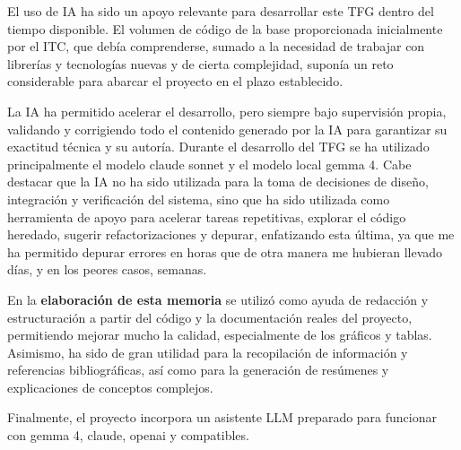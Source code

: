 El uso de IA ha sido un apoyo relevante para desarrollar este TFG dentro del tiempo disponible.
El volumen de código de la base proporcionada inicialmente por el ITC, que debía comprenderse,
sumado a la necesidad de trabajar con librerías y tecnologías nuevas y de cierta complejidad,
suponía un reto considerable para abarcar el proyecto en el plazo establecido.

La IA ha permitido acelerar el desarrollo, pero siempre bajo supervisión propia, validando y 
corrigiendo todo el contenido generado por la IA para garantizar su exactitud técnica y su autoría.
Durante el desarrollo del TFG se ha utilizado principalmente el modelo claude sonnet y el modelo local
gemma 4. Cabe destacar que la IA no ha sido utilizada para la toma de decisiones de diseño, 
integración y verificación del sistema, sino que ha sido utilizada como herramienta de apoyo para acelerar 
tareas repetitivas, explorar el código heredado, sugerir refactorizaciones y depurar, enfatizando esta última, 
ya que me ha permitido depurar errores en horas que de otra manera me hubieran llevado días, y en los peores casos, semanas.

En la \textbf{elaboración de esta memoria} se utilizó como ayuda de redacción
y estructuración a partir del código y la documentación reales del proyecto, permitiendo mejorar mucho
la calidad, especialmente de los gráficos y tablas. Asimismo, ha sido de gran utilidad para la recopilación
de información y referencias bibliográficas, así como para la generación de resúmenes 
y explicaciones de conceptos complejos.

Finalmente, el proyecto incorpora un asistente LLM preparado para funcionar con gemma 4, claude, openai y compatibles.
